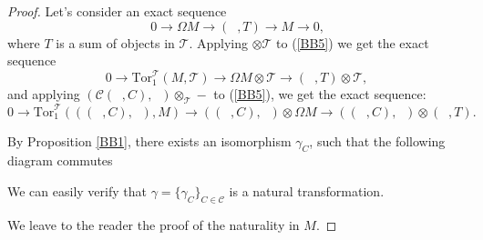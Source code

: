\documentclass{amsart}
\theoremstyle{plain}
\numberwithin{equation}{section}
\begin{document}
\begin{proof}
Let's consider an exact sequence
\begin{equation}
0\rightarrow \Omega M\rightarrow (\;\;,T)\rightarrow M\rightarrow 0\text{,}
\label{BB5}
\end{equation}where $T$ is a sum of objects in $\mathcal{T}$. Applying $\otimes \mathcal{T}
$ to (\ref{BB5}) we get the exact sequence
\begin{equation*}
0\rightarrow \mathrm{Tor}_{1}^{\mathcal{T}}(M,\mathcal{T})\rightarrow \Omega
M\otimes \mathcal{T}\rightarrow (\;\;,T)\otimes \mathcal{T}{,}
\end{equation*}and applying $(\mathcal{C}(\;\;,C),\;\;)\otimes _{\mathcal{T}}-$ to (\ref{BB5}), we get the exact sequence:
\begin{equation*}
0\rightarrow \mathrm{Tor}_{1}^{\mathcal{T}}(((\;\;,C),\;\;),M)\rightarrow
((\;\;,C),\;\;)\otimes \Omega M\rightarrow ((\;\;,C),\;\;)\otimes (\;\;,T)\text{.}
\end{equation*}

By Proposition \ref{BB1}, there exists an isomorphism $\gamma _{C}$, such
that the following diagram commutes


We can easily verify that $\gamma =\{\gamma _{C}\}_{C\in \mathcal{C}}$ is a
natural transformation.

We leave to the reader the proof of the naturality in $M$.
\end{proof}
\end{document}
